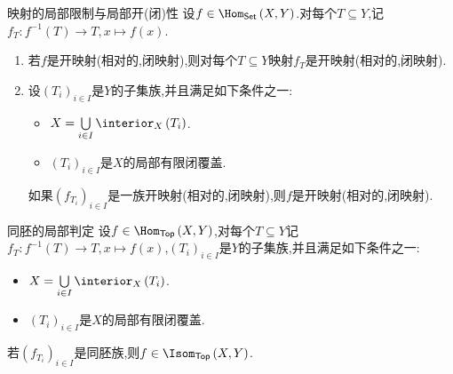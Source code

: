 \begin{proposition}{映射的局部限制与局部开(闭)性}{}
	设$f\in\Hom_{\mathsf{Set}}\left(X,Y\right)$.对每个$T\subseteq Y$,记$f_{T}:f^{-1}\left(T\right)\to T,x\mapsto f\left(x\right)$.
	\begin{enumerate}
		\item 若$f$是开映射(相对的,闭映射),则对每个$T\subseteq Y$映射$f_{T}$是开映射(相对的,闭映射).
		\item 设$\left(T_{i}\right)_{i\in I}$是$Y$的子集族,并且满足如下条件之一:
		\begin{itemize}
			\item $X=\bigcup\limits_{i\in I}\interior_{X}\left(T_{i}\right)$.
			\item $\left(T_{i}\right)_{i\in I}$是$X$的局部有限闭覆盖.
		\end{itemize}
		如果$\left(f_{T_{i}}\right)_{i\in I}$是一族开映射(相对的,闭映射),则$f$是开映射(相对的,闭映射).
	\end{enumerate}
\end{proposition}

\begin{corollary}{同胚的局部判定}{}
	设$f\in\Hom_{\mathsf{Top}}\left(X,Y\right)$,对每个$T\subseteq Y$记$f_{T}:f^{-1}\left(T\right)\to T,x\mapsto f\left(x\right)$,$\left(T_{i}\right)_{i\in I}$是$Y$的子集族,并且满足如下条件之一:
	\begin{itemize}
		\item $X=\bigcup\limits_{i\in I}\interior_{X}\left(T_{i}\right)$.
		\item $\left(T_{i}\right)_{i\in I}$是$X$的局部有限闭覆盖.
	\end{itemize}
	若$\left(f_{T_{i}}\right)_{i\in I}$是同胚族,则$f\in\Isom_{\mathsf{Top}}\left(X,Y\right)$.
\end{corollary}




